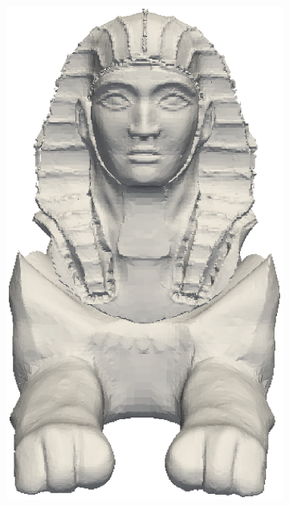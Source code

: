 \begin{figure}
\begin{subfigure}[b]{0.49\linewidth}
{            \includegraphics{octree/ex_images/sphnix_front.eps}
        }
    \end{subfigure} \\
    \begin{subfigure}[b]{0.49\linewidth}
        \centering
\end{subfigure}
\end{figure}
